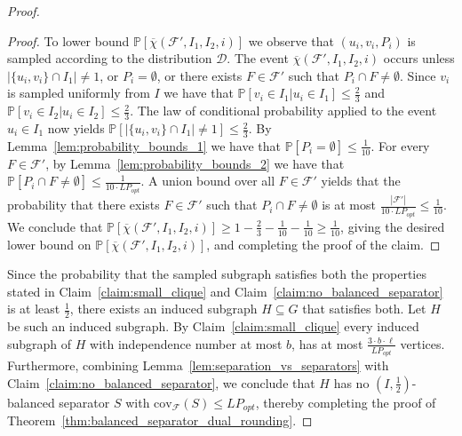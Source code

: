 \documentclass[11pt]{amsart}
\newcommand{\cal}{\mathcal}
\newcommand{\lpopt}{LP_{opt}}
\begin{document}
\begin{proof}
\begin{proof}
        To lower bound $\mathbb{P}[\overline{\chi}({\cal F}', I_1, I_2, i)]$ we observe that $(u_i, v_i, P_i)$ is sampled according to the distribution ${\cal D}$. The event $\overline{\chi}({\cal F}', I_1, I_2, i)$ occurs unless $|\{u_i, v_i\} \cap I_1| \neq 1$, or $P_i = \emptyset$, or there exists $F \in {\cal F}'$ such that $P_i \cap F \neq \emptyset$. Since $v_i$ is sampled uniformly from $I$ we have that  $\mathbb{P}[v_i \in I_1 | u_i \in I_1] \leq \frac{2}{3}$ and $\mathbb{P}[v_i \in I_2 | u_i \in I_2] \leq \frac{2}{3}$. The law of conditional probability applied to the event $u_i \in I_1$ now yields $\mathbb{P}[|\{u_i, v_i\} \cap I_1| \neq 1] \leq \frac{2}{3}$. By Lemma~\ref{lem:probability_bounds_1} we have that $\mathbb{P}[P_i = \emptyset] \leq \frac{1}{10}$. For every $F \in {\cal F}'$, by Lemma~\ref{lem:probability_bounds_2} we have that $\mathbb{P}[P_i \cap F \neq \emptyset] \leq \frac{1}{10 \cdot \lpopt}$. A union bound over all $F \in {\cal F}'$ yields that the probability that there exists $F \in {\cal F}'$ such that $P_i \cap F \neq \emptyset$ is at most $\frac{|{\cal F}'|}{10 \cdot \lpopt} \leq \frac{1}{10}$. We conclude that $\mathbb{P}[\overline{\chi}({\cal F}', I_1, I_2, i)] \geq 1 - \frac{2}{3} - \frac{1}{10} - \frac{1}{10} \geq \frac{1}{10}$, giving the desired lower bound on $\mathbb{P}[\overline{\chi}({\cal F}', I_1, I_2, i)]$, and completing the proof of the claim. 
    \end{proof}

Since the probability that the sampled subgraph satisfies both the properties stated in Claim~\ref{claim:small_clique} and Claim~\ref{claim:no_balanced_separator} is at least $\frac{1}{2}$, there exists an induced subgraph $H \subseteq G$ that satisfies both. Let $H$ be such an induced subgraph. By Claim~\ref{claim:small_clique} every induced subgraph of $H$ with independence number at most $b$, has at most $\frac{3 \cdot b \cdot \ell}{\lpopt}$ vertices. Furthermore, combining Lemma~\ref{lem:separation_vs_separators} with Claim~\ref{claim:no_balanced_separator}, we conclude that $H$ has no $(I,\frac{1}{2})$-balanced separator $S$ with $\mathrm{cov}_{\mathcal{F}}(S) \leq \lpopt$, thereby completing the proof of Theorem~\ref{thm:balanced_separator_dual_rounding}.

\end{proof}
\end{document}
